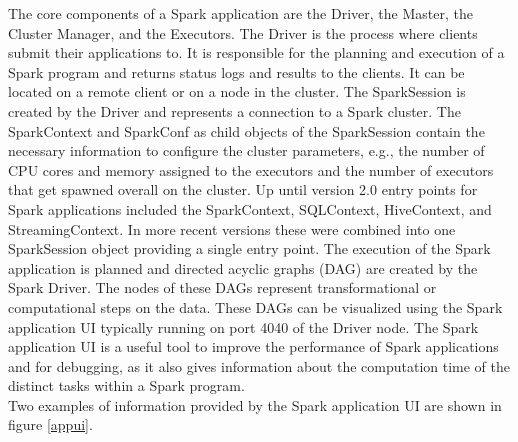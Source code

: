 \noindent The core components of a Spark application are the Driver, the Master, the Cluster Manager, and the Executors. The Driver is the process where clients submit their applications to. It is responsible for the planning and execution of a Spark program and returns status logs and results to the clients. It can be located on a remote client or on a node in the cluster. The SparkSession is created by the Driver and represents a connection to a Spark cluster. The SparkContext and SparkConf as child objects of the SparkSession contain the necessary information to configure the cluster parameters, e.g., the number of CPU cores and memory assigned to the executors and the number of executors that get spawned overall on the cluster. Up until version 2.0 entry points for Spark applications included the SparkContext, SQLContext, HiveContext, and StreamingContext. In more recent versions these were combined into one SparkSession object providing a single entry point.
The execution of the Spark application is planned and directed acyclic graphs (DAG) are created by the Spark Driver. The nodes of these DAGs represent transformational or computational steps on the data. These DAGs can be visualized using the Spark application UI typically running on port 4040 of the Driver node. The Spark application UI is a useful tool to improve the performance of Spark applications and for debugging, as it also gives information about the computation time of the distinct tasks within a Spark program. \cite[pp. 45 ff]{sparkbook1}\\
Two examples of information provided by the Spark application UI are shown in figure \ref{appui}.\\


